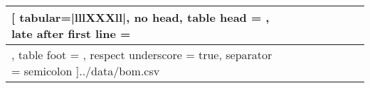 \begin{tabularx}{\linewidth}{lllXXXll}
	\csvreader[
		tabular=|lllXXXll|,
		no head,
		table head = \hline,
		late after first line = \\\hline,
		table foot = \hline,
		respect underscore = true,
		separator = semicolon
	]{../data/bom.csv}{}{%
		\ifnum\thecsvrow=18 \hline \fi%
		\csvcoli &%
		\csvcolii &%
		\csvcoliii &%
		\csvcoliv &%
		\csvcolv &%
		\csvcolvi &%
		\csvcolvii &%
		\csvcolviii %
	}
	\label{bom}
\end{tabularx}
